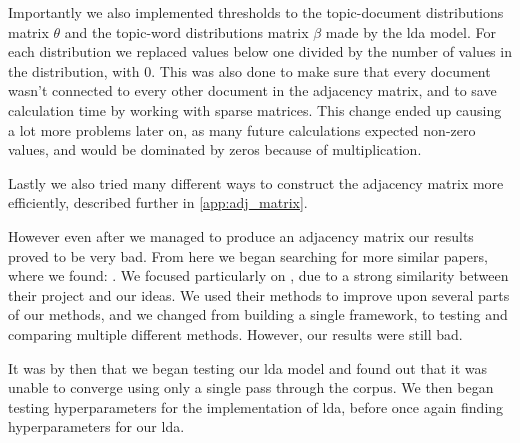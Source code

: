 Importantly we also implemented thresholds to the topic-document distributions matrix $\theta$ and  the topic-word distributions matrix $\beta$ made by the \gls{lda} model.
For each distribution we replaced values below one divided by the number of values in the distribution, with 0.
This was also done to make sure that every document wasn't connected to every other document in the adjacency matrix, and to save calculation time by working with sparse matrices.
This change ended up causing a lot more problems later on, as many future calculations expected non-zero values, and would be dominated by zeros because of multiplication.

Lastly we also tried many different ways to construct the adjacency matrix more efficiently, described further in \autoref{app:adj_matrix}.

However even after we managed to produce an adjacency matrix our results proved to be very bad.
From here we began searching for more similar papers, where we found: .
We focused particularly on , due to a strong similarity between their project and our ideas.
We used their methods to improve upon several parts of our methods, and we changed from building a single framework, to testing and comparing multiple different methods. 
However, our results were still bad.

It was by then that we began testing our \gls{lda} model and found out that it was unable to converge using only a single pass through the corpus. 
We then began testing hyperparameters for the implementation of \gls{lda}, before once again finding hyperparameters for our \gls{lda}.
